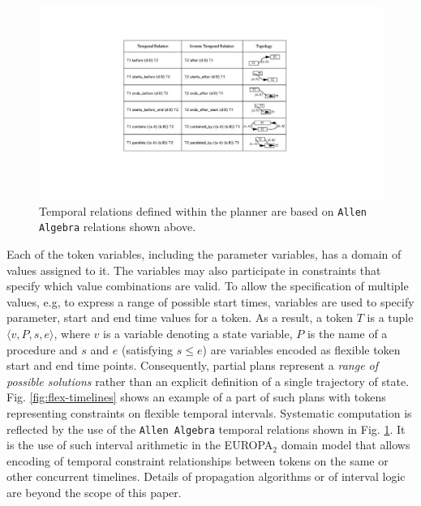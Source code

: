\begin{figure}
\centering
\includegraphics[scale=0.3]{figs/Allen-algebra.pdf}
\caption{\small Temporal relations defined within the planner are
  based on \texttt{Allen Algebra} relations shown above.}
\label{fig:allen-algebra}
\vskip-0.3cm
\end{figure}
 
Each of the token variables, including the parameter variables, has a
domain of values assigned to it.  The variables may also participate
in constraints that specify which value combinations are valid.  To
allow the specification of multiple values, e.g, to express a range of
possible start times, variables are used to specify parameter, start
and end time values for a token.  As a result, a token $T$ is a tuple
$\langle v, P, s, e \rangle$, where $v$ is a variable denoting a state
variable, $P$ is the name of a procedure and $s$ and $e$ (satisfying
$s\leq e$) are variables encoded as flexible token start and end time
points. Consequently, partial plans represent a \textit{range of
  possible solutions} rather than an explicit definition of a single
trajectory of state.  Fig. \ref{fig:flex-timelines} shows an example
of a part of such plans with tokens representing constraints on
flexible temporal intervals. Systematic computation is reflected by
the use of the \texttt{Allen Algebra} \cite{allen84} temporal
relations shown in Fig. \ref{fig:allen-algebra}. It is the use of such
interval arithmetic in the EUROPA$_2$ domain model that allows
encoding of temporal constraint relationships between tokens on the
same or other concurrent timelines. Details of propagation algorithms
or of interval logic are beyond the scope of this paper.

